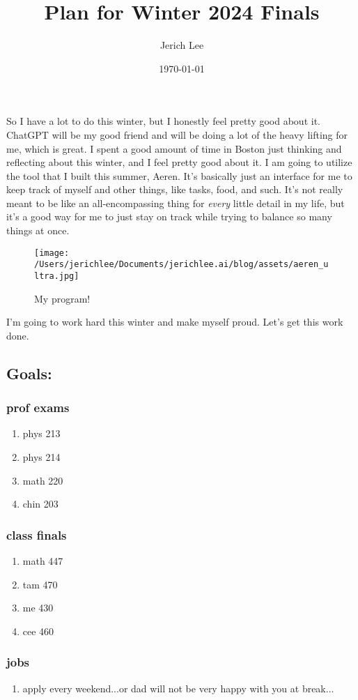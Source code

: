 \documentclass[12pt]{article}
\title{Plan for Winter 2024 Finals}
\author{Jerich Lee}
\date{\today}
\theoremstyle{definition} %
\theoremstyle{plain} %
\begin{document}
\maketitle
So I have a lot to do this winter, but I honestly feel pretty good about it. ChatGPT will be my good friend and will be doing a lot of the heavy lifting for me, which is 
great. I spent a good amount of time in Boston just thinking and reflecting about this winter, and I feel pretty good about it.
\vspace{.5cm} 
I am going to utilize the tool that I built this summer, Aeren. It's basically just an interface for me to keep track of myself and other things, like tasks, food, and such. It's not really
meant to be like an all-encompassing thing for \emph{every} little detail in my life, but it's a good way for me to just stay on track while trying to balance so many things at once.
\begin{figure}[htbp]
    \centering
    \texttt{[image: /Users/jerichlee/Documents/jerichlee.ai/blog/assets/aeren\_ultra.jpg]}
    \caption{My program!} 
    \label{fig:}
\end{figure}
I'm going to work hard this winter and make myself proud. Let's get this work done.
\vspace{.5cm} 
\subsection{Goals:}
\subsubsection{prof exams}
   \begin{enumerate}
    \item phys 213
    \item phys 214
    \item math 220
    \item chin 203
   \end{enumerate}
   \subsubsection{class finals}
   \begin{enumerate}
    \item math 447
    \item tam 470
    \item me 430
    \item cee 460
   \end{enumerate}
   \subsubsection{jobs}
   \begin{enumerate}
    \item apply every weekend...or dad will not be very happy with you at break... 
   \end{enumerate}
   \vspace{.5cm}  
\end{document}
